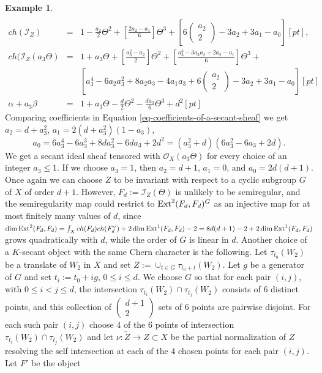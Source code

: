 \documentclass[12pt]{amsart}
\numberwithin{equation}{subsection}
\theoremstyle{plain}
\theoremstyle{definition}
\newtheorem{example}[thm]{Example}
\newcommand{\StructureSheaf}[1]{{\mathcal O}_{#1}}
\newcommand{\Ext}{{\rm Ext}}
\newcommand{\Ideal}[1]{{\mathcal I}_{#1}}
\newcommand{\Choose}[2]
{\left(\!\!\begin{array}{c}#1\\#2\end{array}\!\!\right)}
\begin{document}
\begin{example}
\begin{eqnarray*}
\\
ch(\Ideal{Z})&=& 1-\frac{a_2}{2}\Theta^2+\left[\frac{2a_2-a_1}{6}\right]\Theta^3+
\left[
6\Choose{a_2}{2}-3a_2+3a_1-a_0
\right][pt],
\\
ch(\Ideal{Z}(a_3\Theta)&=&
1+a_3\Theta+
\left[
\frac{a_3^2-a_2}{2}
\right]\Theta^2+
\left[
\frac{a_3^3-3a_3a_2+2a_2-a_1}{6}
\right]\Theta^3+
\\
&&
\left[
a_3^4-6a_2a_3^2+8a_2a_3-4a_1a_3+6\Choose{a_2}{2}-3a_2+3a_1-a_0
\right][pt]
\\
\alpha+a_3\beta&=&
1+a_3\Theta-\frac{d}{2}\Theta^2-\frac{da_3}{6}\Theta^3+d^2[pt]
\end{eqnarray*}
Comparing coefficients in Equation \ref{eq-coefficients-of-a-secant-sheaf}
we get $a_2=d+a_3^2$, $a_1=2(d+a_3^2)(1-a_3)$, 
\[
a_0=6a_3^4-6a_3^3+8da_3^2-6da_3+2d^2=(a_3^2+d)(6a_3^2-6a_3+2d).
\]
We get a secant ideal sheaf tensored with $\StructureSheaf{X}(a_3\Theta)$ for every choice of an integer $a_3\leq 1$.
If we choose $a_3=1$, then $a_2=d+1$, $a_1=0$, and $a_0=2d(d+1)$. 
Once again we can choose $Z$ to be invariant with respect to a cyclic subgroup $G$ of $X$ of order $d+1$. 
However, $F_d:=\Ideal{Z}(\Theta)$ is unlikely to be semiregular, and 
the semiregularity map could restrict to $\Ext^2(F_d,F_d)^{G}$ as an injective map for at most finitely many values of $d$, 
since $\dim\Ext^2(F_d,F_d)=\int_X ch(F_d)ch(F_d^\vee)+2\dim\Ext^1(F_d,F_d)-2=8d(d+1)-2+2\dim\Ext^1(F_d,F_d)$ 
grows quadratically
with $d$, while the order of $G$ is linear in $d$.
Another choice of a $K$-secant object with the same Chern character is the following. 
Let $\tau_{t_0}(W_2)$ be a translate of $W_2$ in $X$ and set $Z:=\cup_{t\in G}\tau_{t_0+t}(W_2)$. 
Let $g$ be a generator of $G$ and set $t_i:=t_0+ig$, $0\leq i\leq d$.
We choose $G$ so that 
for each pair $(i,j)$, with $0\leq i<j\leq d$, the intersection $\tau_{t_i}(W_2)\cap\tau_{t_j}(W_2)$ consists of $6$ distinct points, and this collection of $\Choose{d+1}{2}$ sets of $6$ points are pairwise disjoint. For each such pair $(i,j)$ 
choose $4$ of the $6$ points of intersection $\tau_{t_i}(W_2)\cap \tau_{t_j}(W_2)$ and let $\nu:\tilde{Z}\rightarrow Z\subset X$ be the partial normalization of $Z$ resolving the self intersection at each of the $4$ chosen points for each pair $(i,j)$. Let $F'$ be the object

\end{example}
\end{document}
